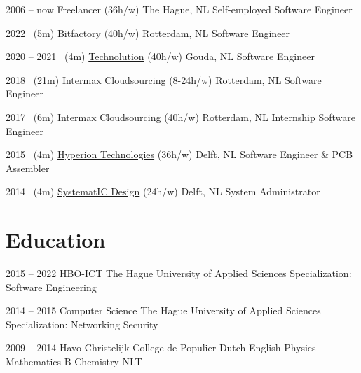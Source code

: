 \documentclass[]{cv-timvisee}
\begin{document}
\begin{entrylist}

\entry
{2006 -- now}
{Freelancer {\small\normalfont \small(36h/w)}}
{The Hague, NL}
{Self-employed Software Engineer}

\entry
{2022 ~\hfill \small(5m)}
{\href{https://bitfactory.nl/}{Bitfactory} {\small\normalfont (40h/w)}}
{Rotterdam, NL}
{Software Engineer}

\entry
{2020 -- 2021 ~\hfill \small(4m)}
{\href{https://technolution.eu/}{Technolution} {\small\normalfont (40h/w)}}
{Gouda, NL}
{Software Engineer}

\entry
{2018 ~\hfill \small(21m)}
{\href{https://intermax.nl/}{Intermax Cloudsourcing} {\small\normalfont (8-24h/w)}}
{Rotterdam, NL}
{Software Engineer}

\entry
{2017 ~\hfill \small(6m)}
{\href{https://intermax.nl/}{Intermax Cloudsourcing} {\small\normalfont (40h/w)}}
{Rotterdam, NL}
{Internship Software Engineer}

\entry
{2015 ~\hfill \small(4m)}
{\href{https://hyperiontechnologies.nl/}{Hyperion Technologies} {\small\normalfont (36h/w)}}
{Delft, NL}
{Software Engineer \& PCB Assembler}

\entry
{2014 ~\hfill \small(4m)}
{\href{https://systemat-ic.com/}{SystematIC Design} {\small\normalfont (24h/w)}}
{Delft, NL}
{System Administrator}

\end{entrylist}


\section{Education}

\begin{entrylist}

\entry
{2015 -- 2022}
{HBO-ICT}
{The Hague University of Applied Sciences}
{Specialization: Software Engineering}

\entry
{2014 -- 2015}
{Computer Science}
{The Hague University of Applied Sciences}
{Specialization: Networking \textperiodcentered{} Security}

\entry
{2009 -- 2014}
{Havo}
{Christelijk College de Populier}
{Dutch \textperiodcentered{} English \textperiodcentered{} Physics \textperiodcentered{} Mathematics B \textperiodcentered{} Chemistry \textperiodcentered{} NLT}

\end{entrylist}
\end{document}
